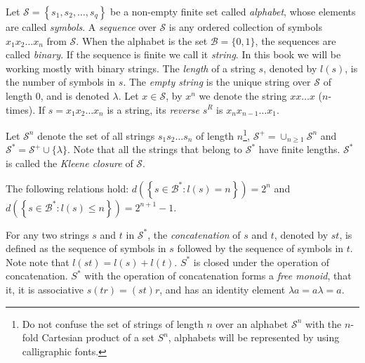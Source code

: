 Let $\mathcal{S}=\left\{ s_{1},s_{2},\ldots,s_{q}\right\}$ be a non-empty finite set called \emph{alphabet}, whose elements are called \emph{symbols}. A \emph{sequence} over $\mathcal{S}$ is any ordered collection of symbols $x_1 x_2 \dots x_n$ from $\mathcal{S}$. When the alphabet is the set $\mathcal{B} = \{0, 1\}$, the sequences are called \emph{binary}. If the sequence is finite we call it \emph{string}. In this book we will be working mostly with binary strings. The \emph{length} of a string $s$, denoted by $l(s)$, is the number of symbols in $s$. The \emph{empty string} is the unique string over $\mathcal{S}$ of length 0, and is denoted $\lambda$. Let $x \in \mathcal{S}$, by $x^n$ we denote the string $x x \ldots x$ ($n$-times). If $s = x_1 x_2 \dots x_n$ is a string, its \emph{reverse} $s^R$ is $x_n x_{n-1} \dots x_1$.

Let $\mathcal{S}^{n}$ denote the set of all strings $s_{1}s_{2}\ldots s_{n}$ of length $n$\footnote{Do not confuse the set of strings of length $n$ over an alphabet $\mathcal{S}^n$ with the $n$-fold Cartesian product of a set $S^n$, alphabets will be represented by using calligraphic fonts.}, $\mathcal{S}^{+}=\cup_{n\geq1}\mathcal{S}^{n}$ and $\mathcal{S}^{\ast} = \mathcal{S}^{+} \cup \{\lambda\}$. Note that all the strings that belong to $\mathcal{S}^{\ast}$ have finite lengths. $\mathcal{S}^{\ast}$ is called the \emph{Kleene closure} of $\mathcal{S}$.

\begin{example}
The following relations hold: $d \left( \left\{ s \in \mathcal{B}^{\ast} : l(s) = n \right\} \right) = 2^n$ and $d \left( \left\{ s \in \mathcal{B}^{\ast} : l(s) \leq n \right\} \right) = 2^{n+1}-1$.
\end{example}













For any two strings $s$ and $t$ in $\mathcal{S}^{\ast}$, the \emph{concatenation} of $s$ and $t$, denoted by $st$, is defined as the sequence of symbols in $s$ followed by the sequence of symbols in $t$. Note note that $l(st) = l(s) + l(t)$. $S^\ast$ is closed under the operation of concatenation. $S^\ast$ with the operation of concatenation forms a \emph{free monoid}, that it, it is associative  $s(tr)=(st)r$, and has an identity element $\lambda a = a \lambda = a$.

